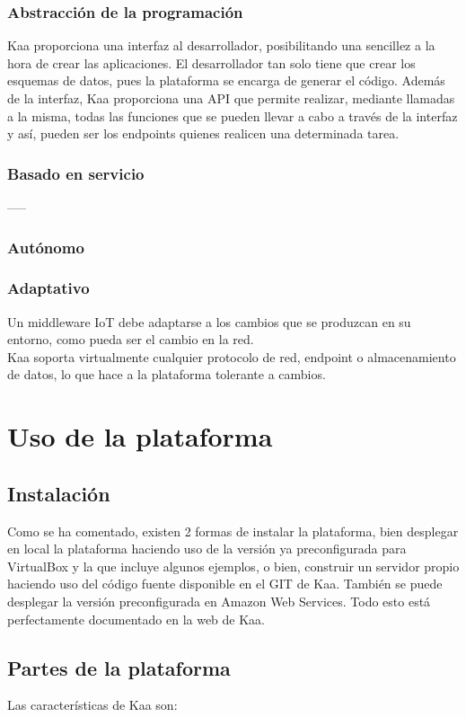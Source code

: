 \documentclass[12pt, twoside]{book}
\begin{document}
\subsubsection*{Abstracción de la programación}
Kaa proporciona una interfaz al desarrollador, posibilitando una sencillez a la hora de crear las aplicaciones. El desarrollador tan solo tiene que crear los esquemas de datos, pues la plataforma se encarga de generar el código. Además de la interfaz, Kaa proporciona una API que permite realizar, mediante llamadas a la misma, todas las funciones que se pueden llevar a cabo a través de la interfaz y así, pueden ser los endpoints quienes realicen una determinada tarea.
\subsubsection*{Basado en servicio}
-----

\subsubsection*{Autónomo}

\subsubsection*{Adaptativo}
Un middleware IoT debe adaptarse a los cambios que se produzcan en su entorno, como pueda ser el cambio en la red.\\Kaa soporta virtualmente cualquier protocolo de red, endpoint o almacenamiento de datos, lo que hace a la plataforma tolerante a cambios.



\section{Uso de la plataforma}
\subsection{Instalación}
Como se ha comentado, existen 2 formas de instalar la plataforma, bien desplegar en local la plataforma haciendo uso de la versión ya preconfigurada para VirtualBox y la que incluye algunos ejemplos, o bien, construir un servidor propio haciendo uso del código fuente disponible en el GIT de Kaa. También se puede desplegar la versión preconfigurada en Amazon Web Services. Todo esto está perfectamente documentado en la web de Kaa.
\subsection{Partes de la plataforma}
Las características de Kaa son:
\end{document}
